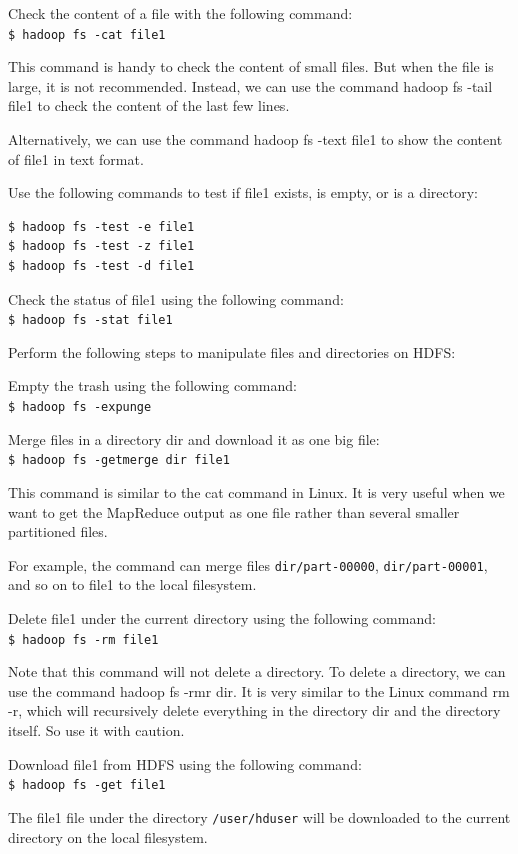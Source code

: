 Check the content of a file with the following command: \\
\verb|$ hadoop fs -cat file1|

This command is handy to check the content of small files. But when the file is large, it is not recommended. Instead, we can use the command hadoop fs -tail file1 to check the content of the last few lines.

Alternatively, we can use the command hadoop fs -text file1 to show the content of file1 in text format.

Use the following commands to test if file1 exists, is empty, or is a directory:
\begin{verbatim}
$ hadoop fs -test -e file1
$ hadoop fs -test -z file1
$ hadoop fs -test -d file1
\end{verbatim}

Check the status of file1 using the following command: \\
\verb|$ hadoop fs -stat file1|

Perform the following steps to manipulate files and directories on HDFS:

Empty the trash using the following command: \\
\verb|$ hadoop fs -expunge|

Merge files in a directory dir and download it as one big file:\\
\verb|$ hadoop fs -getmerge dir file1|

This command is similar to the cat command in Linux. It is very useful when we want to get the MapReduce output as one file rather than several smaller partitioned files.

For example, the command can merge files \verb|dir/part-00000|, \verb|dir/part-00001|, and so on to file1 to the local filesystem.

Delete file1 under the current directory using the following command:\\
\verb|$ hadoop fs -rm file1|

Note that this command will not delete a directory. To delete a directory, we can use the command hadoop fs -rmr dir. It is very similar to the Linux command rm -r, which will recursively delete everything in the directory dir and the directory itself. So use it with caution.

Download file1 from HDFS using the following command: \\
\verb|$ hadoop fs -get file1|

The file1 file under the directory \verb|/user/hduser| will be downloaded to the current directory on the local filesystem.

